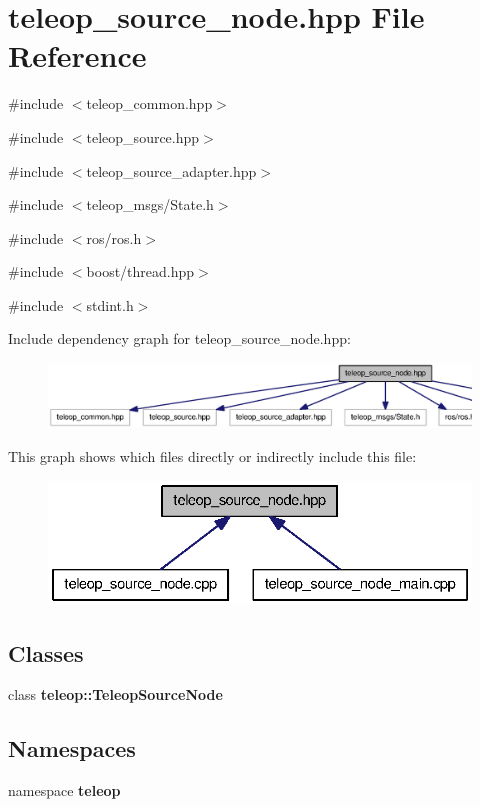 \section{teleop\_\-source\_\-node.hpp File Reference}
\label{teleop__source__node_8hpp}
{\ttfamily \#include $<$teleop\_\-common.hpp$>$}\par
{\ttfamily \#include $<$teleop\_\-source.hpp$>$}\par
{\ttfamily \#include $<$teleop\_\-source\_\-adapter.hpp$>$}\par
{\ttfamily \#include $<$teleop\_\-msgs/State.h$>$}\par
{\ttfamily \#include $<$ros/ros.h$>$}\par
{\ttfamily \#include $<$boost/thread.hpp$>$}\par
{\ttfamily \#include $<$stdint.h$>$}\par
Include dependency graph for teleop\_\-source\_\-node.hpp:
\nopagebreak
\begin{figure}[H]
\begin{center}
\leavevmode
\includegraphics[width=400pt]{teleop__source__node_8hpp__incl}
\end{center}
\end{figure}
This graph shows which files directly or indirectly include this file:
\nopagebreak
\begin{figure}[H]
\begin{center}
\leavevmode
\includegraphics[width=332pt]{teleop__source__node_8hpp__dep__incl}
\end{center}
\end{figure}
\subsection*{Classes}
\begin{DoxyCompactItemize}
\item 
class {\bf teleop::TeleopSourceNode}
\end{DoxyCompactItemize}
\subsection*{Namespaces}
\begin{DoxyCompactItemize}
\item 
namespace {\bf teleop}
\end{DoxyCompactItemize}
